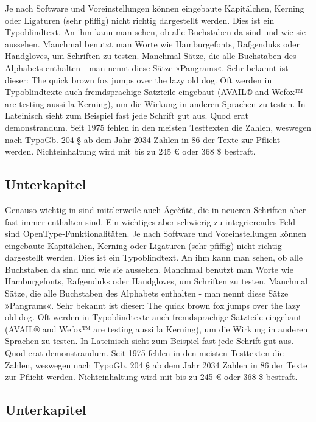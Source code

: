 Je nach Software und Voreinstellungen können eingebaute Kapitälchen, Kerning oder Ligaturen (sehr pfiffig) nicht richtig dargestellt werden. Dies ist ein Typoblindtext. An ihm kann man sehen, ob alle Buchstaben da sind und wie sie aussehen. Manchmal benutzt man Worte wie Hamburgefonts, Rafgenduks oder Handgloves, um Schriften zu testen. Manchmal Sätze, die alle Buchstaben des Alphabets enthalten - man nennt diese Sätze »Pangrams«. Sehr bekannt ist dieser: The quick brown fox jumps over the lazy old dog. Oft werden in Typoblindtexte auch fremdsprachige Satzteile eingebaut (AVAIL® and Wefox™ are testing aussi la Kerning), um die Wirkung in anderen Sprachen zu testen. In Lateinisch sieht zum Beispiel fast jede Schrift gut aus. Quod erat demonstrandum. Seit 1975 fehlen in den meisten Testtexten die Zahlen, weswegen nach TypoGb. 204 § ab dem Jahr 2034 Zahlen in 86 der Texte zur Pflicht werden. Nichteinhaltung wird mit bis zu 245 € oder 368 \$ bestraft.

\subsection{Unterkapitel}

Genauso wichtig in sind mittlerweile auch Âçcèñtë, die in neueren Schriften aber fast immer enthalten sind. Ein wichtiges aber schwierig zu integrierendes Feld sind OpenType-Funktionalitäten. Je nach Software und Voreinstellungen können eingebaute Kapitälchen, Kerning oder Ligaturen (sehr pfiffig) nicht richtig dargestellt werden. Dies ist ein Typoblindtext. An ihm kann man sehen, ob alle Buchstaben da sind und wie sie aussehen. Manchmal benutzt man Worte wie Hamburgefonts, Rafgenduks oder Handgloves, um Schriften zu testen. Manchmal Sätze, die alle Buchstaben des Alphabets enthalten - man nennt diese Sätze »Pangrams«. Sehr bekannt ist dieser: The quick brown fox jumps over the lazy old dog. Oft werden in Typoblindtexte auch fremdsprachige Satzteile eingebaut (AVAIL® and Wefox™ are testing aussi la Kerning), um die Wirkung in anderen Sprachen zu testen. In Lateinisch sieht zum Beispiel fast jede Schrift gut aus. Quod erat demonstrandum. Seit 1975 fehlen in den meisten Testtexten die Zahlen, weswegen nach TypoGb. 204 § ab dem Jahr 2034 Zahlen in 86 der Texte zur Pflicht werden. Nichteinhaltung wird mit bis zu 245 € oder 368 \$ bestraft.

\subsection{Unterkapitel}

